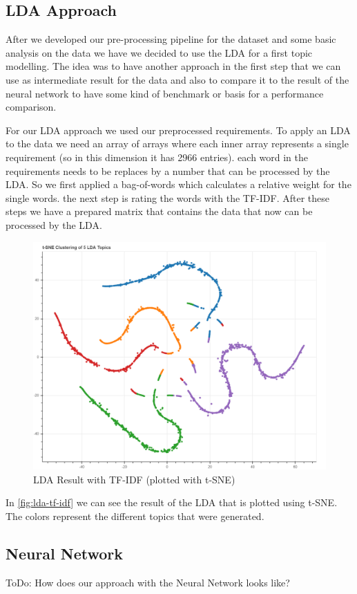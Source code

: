 \subsection{LDA Approach} %
\label{sub:own_lda}
After we developed our pre-processing pipeline for the dataset and some basic analysis on the data we have we decided to use the LDA for a first topic modelling. The idea was to have another approach in the first step that we can use as intermediate result for the data and also to compare it to the result of the neural network to have some kind of benchmark or basis for a performance comparison.


For our LDA approach we used our preprocessed requirements. To apply an LDA to the data we need an array of arrays where each inner array represents a single requirement (so in this dimension it has 2966 entries). each word in the requirements needs to be replaces by a number that can be processed by the LDA. So we first applied a bag-of-words which calculates a relative weight for the single words. the next step is rating the words with the TF-IDF. After these steps we have a prepared matrix that contains the data that now can be processed by the LDA.

\begin{figure}[h]
  \begin{center}
    \includegraphics[width=\textwidth]{screenshots/lda-tf-idf.png}
    \caption{LDA Result with TF-IDF (plotted with t-SNE)}
    \label{fig:lda-tf-idf}
  \end{center}
\end{figure}

In \autoref{fig:lda-tf-idf} we can see the result of the LDA that is plotted using t-SNE. The colors represent the different topics that were generated.

\subsection{Neural Network} %
\label{sub:own_neuralnetwork}

\colorbox{yellow!30}{ToDo:} How does our approach with the Neural Network looks like?
